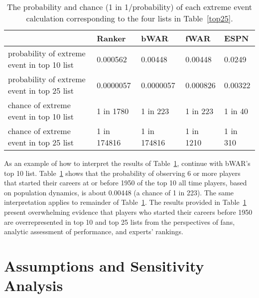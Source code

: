 \documentclass[11pt]{article}\usepackage[]{graphicx}\usepackage[]{color}
\begin{document}
\begin{table}[h!]
\begin{center}
\begin{tabular}{lllll}
\hline
  &  Ranker  &  bWAR  &  fWAR  &  ESPN \\
  \hline
probability of extreme event in top 10 list 
  & 0.000562 
  & 0.00448 
  & 0.00448 
  & 0.0249 \\
probability of extreme event in top 25 list 
  & 0.0000057 
  & 0.0000057 
  & 0.000826 
  & 0.00322 \\
chance of extreme event in top 10 list 
  & 1 in 1780 
  & 1 in 223 
  & 1 in 223 
  & 1 in 40 \\
chance of extreme event in top 25 list 
  & 1 in 174816 
  & 1 in 174816 
  & 1 in 1210 
  & 1 in 310 \\
  \hline
\end{tabular}
\end{center}
\caption{The probability and chance (1 in 1/probability) of each extreme event 
  calculation corresponding to the four lists in Table~\ref{top25}.}
\label{probvalues}
\end{table}

As an example of how to interpret the results of Table~\ref{probvalues}, 
continue with bWAR's top 10 list.  Table~\ref{probvalues} shows that the 
probability of observing 6 or more players that started their careers at 
or before 1950 of the top 10 all time players, based on population 
dynamics, is about 0.00448 
(a chance of 1 in 223).
The same interpretation applies to remainder of Table~\ref{probvalues}.  
The results provided in Table~\ref{probvalues} present overwhelming evidence 
that players who started their careers before 1950 are overrepresented in top 
10 and top 25 lists from the perspectives of fans, analytic assessment of 
performance, and experts' rankings.  %




\section{Assumptions and Sensitivity Analysis}
\label{sec:Assumptions}
\end{document}
